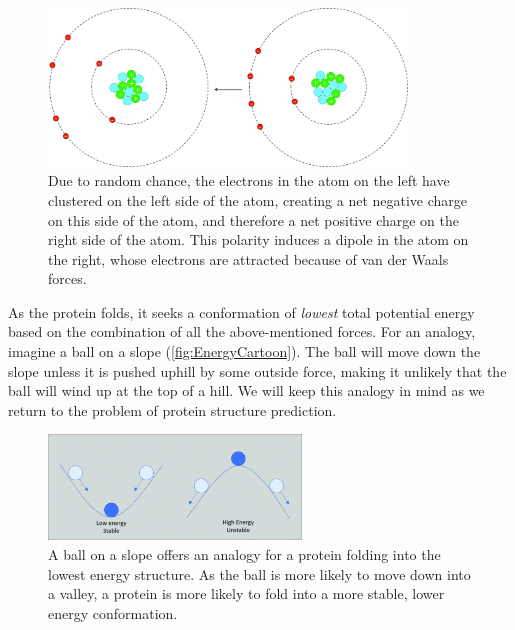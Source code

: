 
\begin{figure}[h]
	\centering
	\mySfFamily
	\includegraphics[width = 0.85\textwidth]{../images_CMYK/van_der_waals}
	\caption{Due to random chance, the electrons in the atom on the left have clustered on the left side of the atom, creating a net negative charge on this side of the atom, and therefore a net positive charge on the right side of the atom. This polarity induces a dipole in the atom on the right, whose electrons are attracted because of van der Waals forces.}
	\label{fig:van_der_waals}
\end{figure}

As the protein folds, it seeks a conformation of \textit{lowest} total potential energy based on the combination of all the above-mentioned forces. For an analogy, imagine a ball on a slope (\autoref{fig:EnergyCartoon}). The ball will move down the slope unless it is pushed uphill by some outside force, making it unlikely that the ball will wind up at the top of a hill. We will keep this analogy in mind as we return to the problem of protein structure prediction.\\

\begin{figure}[h]
	\centering
	\mySfFamily
	\includegraphics[width = 0.6\textwidth]{../images_CMYK/EnergyCartoon}
	\caption{A ball on a slope offers an analogy for a protein folding into the lowest energy structure. As the ball is more likely to move down into a valley, a protein is more likely to fold into a more stable, lower energy conformation.}
	\label{fig:EnergyCartoon}
\end{figure}

